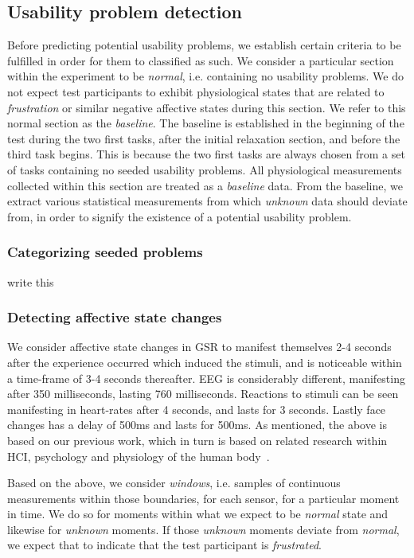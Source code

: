 \subsection{Usability problem detection}
Before predicting potential usability problems, we establish certain criteria to be fulfilled in order for them to
classified as such.  We consider a particular section within the experiment to be \textit{normal}, i.e. containing no
usability problems.  We do not expect test participants to exhibit physiological states that are related to
\textit{frustration} or similar negative affective states during this section. We refer to this normal section as the
\textit{baseline}. The baseline is established in the beginning of the test during the two first tasks, after the
initial relaxation section, and before the third task begins. This is because the two first tasks are always chosen from
a set of tasks containing no seeded usability problems. All physiological measurements collected within this section are
treated as a \textit{baseline} data.  From the baseline, we extract various statistical measurements from which
\textit{unknown} data should deviate from, in order to signify the existence of a potential usability problem.

\subsubsection{Categorizing seeded problems}
write this

\subsubsection{Detecting affective state changes}
We consider affective state changes in GSR to manifest themselves 2-4 seconds after the experience occurred which
induced the stimuli, and is noticeable within a time-frame of 3-4 seconds thereafter. EEG is considerably different,
manifesting after 350 milliseconds, lasting 760 milliseconds. Reactions to stimuli can be seen manifesting in heart-rates
after 4 seconds, and lasts for 3 seconds. Lastly face changes has a delay of 500ms and lasts for 500ms. As mentioned,
the above is based on our previous work, which in turn is based on related research within HCI, psychology and
physiology of the human body~\cite{9th_semester_project}.

Based on the above, we consider \textit{windows}, i.e. samples of continuous measurements within those boundaries, for
each sensor, for a particular moment in time. We do so for moments within what we expect to be \textit{normal} state and
likewise for \textit{unknown} moments. If those \textit{unknown} moments deviate from \textit{normal}, we expect that to
indicate that the test participant is \textit{frustrated}.

